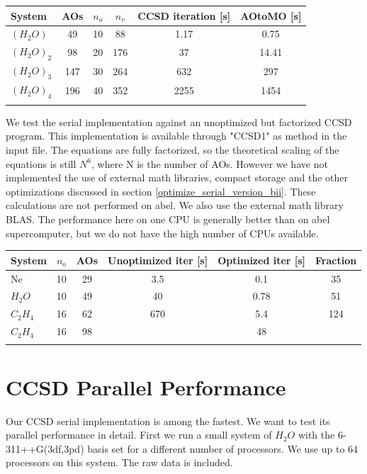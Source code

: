 \documentclass[a4paper,norsk,11pt,twoside]{report}
\begin{document}
\begin{center}
\begin{tabular}{ l c c c c c }
	\hline
  	System & AOs & $n_o$ & $n_v$ & CCSD iteration [s] & AOtoMO [s] \\ \hline
  	$(H_2O)$ & 49 & 10 & 88      & 1.17 & 0.75  \\ 
  	$(H_2O)_2$ & 98 & 20 & 176   & 37 & 14.41 \\ 
  	$(H_2O)_3$ & 147 & 30 & 264  & 632 & 297  \\
  	$(H_2O)_4$ & 196 & 40 & 352  & 2255 & 1454 \\ 
  	\hline
  	\\
	\end{tabular}
\end{center}

We test the serial implementation against an unoptimized but factorized CCSD program. This implementation is available through "CCSD1" as method in the input file. The equations are fully factorized, so the theoretical scaling of the equations is still $N^6$, where N is the number of AOs. However we have not implemented the use of external math libraries, compact storage and the other optimizations discussed in section \ref{optimize_serial_version_bii}. These calculations are not performed on abel. We also use the external math library BLAS. The performance here on one CPU is generally better than on abel supercomputer, but we do not have the high number of CPUs available. 

\begin{center}
\begin{tabular}{ l c c c c c }
	\hline
  	System & $n_o$ & AOs & Unoptimized iter [s] & Optimized iter [s] & Fraction \\ \hline
  	Ne & 10 & 29 & 3.5 & 0.1 & 35 \\
  	$H_2O$ & 10 & 49 & 40 & 0.78 & 51 \\
  	$C_2H_4$ & 16 & 62 & 670 & 5.4 & 124 \\
  	$C_2H_4$ & 16 & 98 &  & 48 &  \\
  	\hline
  	\\
	\end{tabular}
\end{center}

\section{CCSD Parallel Performance}
Our CCSD serial implementation is among the fastest. We want to test its parallel performance in detail. First we run a small system of $H_2O$ with the 6-311++G(3df,3pd) basis set for a different number of processors. We use up to 64 processors on this system. The raw data is included.
   
\end{document}
